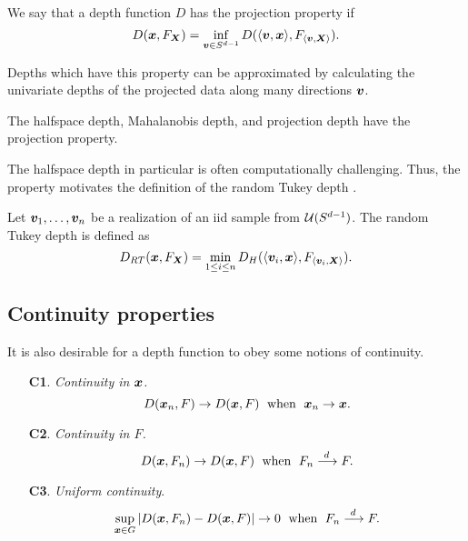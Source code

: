\begin{definition}
    We say that a depth function $D$ has the projection property if
    \begin{equation}
        D(\bm{x}, F_{\bm{X}}) = \inf_{\bm{v} \in S^{d - 1}} D(\langle \bm{v}, \bm{x} \rangle, F_{\langle \bm{v}, \bm{X} \rangle}).
    \end{equation}
\end{definition}

Depths which have this property can be approximated by calculating the
univariate depths of the projected data along many directions $\bm{v}$.


\begin{lemma}
    The halfspace depth, Mahalanobis depth, and projection depth have the
    projection property.
\end{lemma}

The halfspace depth in particular is often computationally challenging.
Thus, the property motivates the definition of the random Tukey depth
\parencite{albertos-reyes-2008a}.

\begin{definition}
    Let $\bm{v}_1, \dots, \bm{v}_n$ be a realization of an iid sample from $\mathcal{U}(S^{d
    - 1})$.
    The random Tukey depth is defined as
    \begin{equation}
        D_{RT}(\bm{x}, F_{\bm{X}}) = \min_{1 \leq i \leq n} D_H(\langle \bm{v}_i, \bm{x} \rangle, F_{\langle \bm{v}_i, \bm{X} \rangle}).
    \end{equation}
\end{definition}



\subsection{Continuity properties}

It is also desirable for a depth function to obey some notions of continuity.
\begin{enumerate}
    \item[\textbf{C1}.] \emph{Continuity in $\bm{x}$.}
    \begin{equation}
        D(\bm{x}_n, F) \to D(\bm{x}, F)\;\text{ when }\; \bm{x}_n \to \bm{x}.
    \end{equation}

    \item[\textbf{C2}.] \emph{Continuity in $F$.}
    \begin{equation}
        D(\bm{x}, F_n) \to D(\bm{x}, F)\;\text{ when }\; F_n \overset{d\,}{\longrightarrow} F.
    \end{equation}

    \item[\textbf{C3}.] \emph{Uniform continuity}.
    \begin{equation}
        \sup_{\bm{x} \in G} |D(\bm{x}, F_n) - D(\bm{x}, F)| \to 0\;\text{ when }\; F_n \overset{d\,}{\longrightarrow} F.
    \end{equation}
\end{enumerate}

